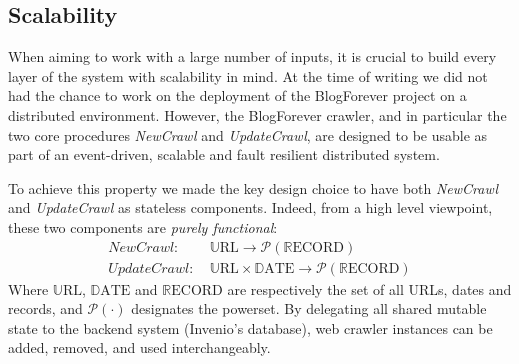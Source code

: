 \subsection{Scalability}
When aiming to work with a large number of inputs, it is crucial to build every layer of the system with scalability in mind\cite{thereactivemanifesto2013}. At the time of writing we did not had the chance to work on the deployment of the BlogForever project on a distributed environment. However, the BlogForever crawler, and in particular the two core procedures \emph{NewCrawl} and \emph{UpdateCrawl}, are designed to be usable as part of an event-driven, scalable and fault resilient distributed system.

To achieve this property we made the key design choice to have both \emph{NewCrawl} and \emph{UpdateCrawl} as stateless components. Indeed, from a high level viewpoint, these two components are \emph{purely functional}:
%
\newcommand\URL{\mathbb{U}\text{RL}}
\newcommand\DATE{\mathbb{D}\text{ATE}}
\newcommand\RECORD{\mathbb{R}\text{ECORD}}
\begin{equation*}
  \begin{split}
    NewCrawl:    &~ \URL \rightarrow \mathcal{P}(\RECORD)\\
    UpdateCrawl: &~ \URL \times \DATE \rightarrow \mathcal{P}(\RECORD)
  \end{split}
\end{equation*}
Where $\URL$, $\DATE$ and $\RECORD$ are respectively the set of all URLs, dates and records, and $\mathcal{P}(\cdot)$ designates the powerset. By delegating all shared mutable state to the backend system (Invenio's database), web crawler instances can be added, removed, and used interchangeably.
